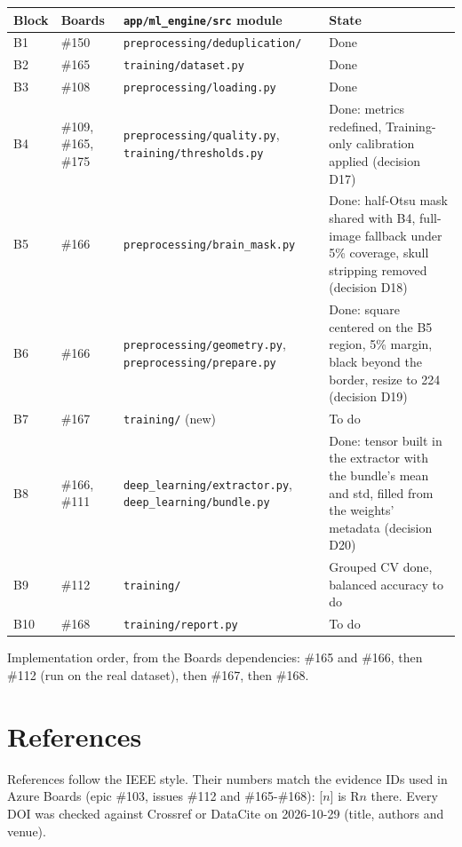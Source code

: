\documentclass[11pt,a4paper]{article}
\newcommand{\board}[1]{\textsf{\##1}}
\begin{document}
\begin{center}
\begin{tabularx}{\textwidth}{@{}l l L L@{}}
\toprule
Block & Boards & \texttt{app/ml\_engine/src} module & State \\
\midrule
B1  & \board{150} & \texttt{preprocessing/deduplication/} & Done \\
B2  & \board{165} & \texttt{training/dataset.py} & Done \\
B3  & \board{108} & \texttt{preprocessing/loading.py} & Done \\
B4  & \board{109}, \board{165}, \board{175} & \texttt{preprocessing/quality.py}, \texttt{training/thresholds.py} & Done: metrics redefined, Training-only calibration applied (decision D17) \\
B5  & \board{166} & \texttt{preprocessing/brain\_mask.py} & Done: half-Otsu mask shared with B4, full-image fallback under 5\% coverage, skull stripping removed (decision D18) \\
B6  & \board{166} & \texttt{preprocessing/geometry.py}, \texttt{preprocessing/prepare.py} & Done: square centered on the B5 region, 5\% margin, black beyond the border, resize to 224 (decision D19) \\
B7  & \board{167} & \texttt{training/} (new) & To do \\
B8  & \board{166}, \board{111} & \texttt{deep\_learning/extractor.py}, \texttt{deep\_learning/bundle.py} & Done: tensor built in the extractor with the bundle's mean and std, filled from the weights' metadata (decision D20) \\
B9  & \board{112} & \texttt{training/} & Grouped CV done, balanced accuracy to do \\
B10 & \board{168} & \texttt{training/report.py} & To do \\
\bottomrule
\end{tabularx}
\end{center}

Implementation order, from the Boards dependencies: \board{165} and \board{166}, then \board{112} (run on the real dataset), then \board{167}, then \board{168}.

\section{References}\label{sec:refs}

References follow the IEEE style. Their numbers match the evidence IDs used in Azure Boards (epic \#103, issues \#112 and \#165-\#168): [$n$] is R$n$ there. Every DOI was checked against Crossref or DataCite on 2026-10-29 (title, authors and venue).
\end{document}
